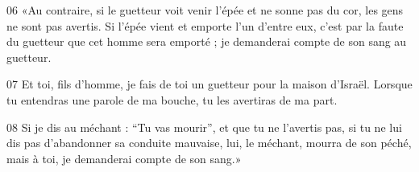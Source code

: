 
06 «Au contraire, si le guetteur voit venir l’épée et ne sonne pas du cor, les gens ne sont pas avertis. Si l’épée vient et emporte l’un d’entre eux, c’est par la faute du guetteur que cet homme sera emporté ; je demanderai compte de son sang au guetteur.

07 Et toi, fils d’homme, je fais de toi un guetteur pour la maison d’Israël. Lorsque tu entendras une parole de ma bouche, tu les avertiras de ma part.

08 Si je dis au méchant : “Tu vas mourir”, et que tu ne l’avertis pas, si tu ne lui dis pas d’abandonner sa conduite mauvaise, lui, le méchant, mourra de son péché, mais à toi, je demanderai compte de son sang.»
